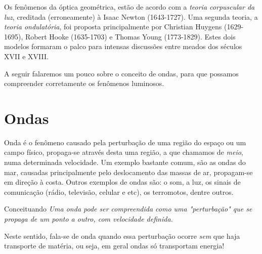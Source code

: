 \noindent Os fenômenos da óptica geométrica, estão de acordo com a \emph{teoria corpuscular da luz}, creditada (erroneamente) à Isaac Newton (1643-1727). Uma segunda teoria, a \emph{teoria ondulatória}, foi proposta principalmente por Christian Huygens (1629-1695), Robert Hooke (1635-1703) e Thomas Young (1773-1829). Estes dois modelos formaram o palco para intensas discussões entre meados dos séculos XVII e XVIII.

A seguir falaremos um pouco sobre o conceito de ondas, para que possamos compreender corretamente os fenômenos luminosos.

\section*{Ondas}
\label{sec:nocoes-basicas-ondas}
Onda é o fenômeno causado pela perturbação de uma região do espaço ou um campo físico, propaga-se através desta uma região, a que chamamos de \emph{meio}, numa determinada velocidade. Um exemplo bastante comum, são as ondas do mar, causadas principalmente pelo deslocamento das massas de ar, propagam-se em direção à costa. Outros exemplos de ondas são: o som, a luz, os sinais de comunicação (rádio, televisão, celular e etc), os terromotos, dentre outros.

\begin{mybox}[colback=white, colframe=amarelo,colbacktitle=amarelo!85!amarelo,]{Conceituando}
    \emph{Uma onda pode ser compreendida como uma "perturbação" que se propaga de um ponto a outro, com velocidade definida.}
\end{mybox}

Neste sentido, fala-se de onda quando essa perturbação ocorre \emph{sem} que haja transporte de matéria, ou seja, em geral ondas só transportam energia!

